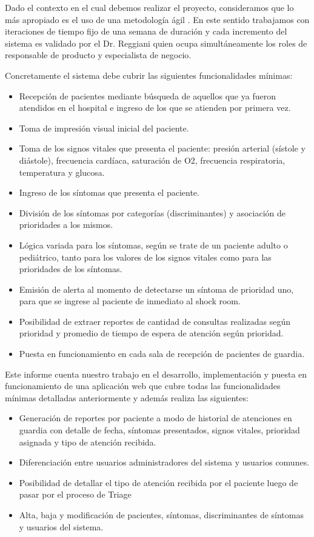 Dado el contexto en el cual debemos realizar el proyecto, consideramos que lo más apropiado es el uso de una metodología ágil \cite{Shore}. En este sentido trabajamos con iteraciones de tiempo fijo de una semana de duración y cada incremento del sistema es validado por el Dr. Reggiani quien ocupa simultáneamente los roles de responsable de producto y especialista de negocio.

Concretamente el sistema debe cubrir las siguientes funcionalidades mínimas:
\begin{itemize}
\item Recepción de pacientes mediante búsqueda de aquellos que ya fueron atendidos en el hospital e ingreso de los que se atienden por primera vez.
\item Toma de impresión visual inicial del paciente.
\item Toma de los signos vitales que presenta el paciente: presión arterial (sístole y diástole), frecuencia cardíaca, saturación de O2, frecuencia respiratoria, temperatura y glucosa.
\item Ingreso de los síntomas que presenta el paciente.
\item División de los síntomas por categorías (discriminantes) y asociación de prioridades a los mismos.
\item Lógica variada para los síntomas, según se trate de un paciente adulto o pediátrico, tanto para los valores de los signos vitales como para las prioridades de los síntomas.
\item Emisión de alerta al momento de detectarse un síntoma de prioridad uno, para que se ingrese al paciente de inmediato al shock room.
\item Posibilidad de extraer reportes de cantidad de consultas realizadas según prioridad y promedio de tiempo de espera de atención según prioridad.
\item Puesta en funcionamiento en cada sala de recepción de pacientes de guardia.
\end{itemize}

Este informe cuenta nuestro trabajo en el desarrollo, implementación y puesta en funcionamiento de una aplicación web que cubre todas las funcionalidades mínimas detalladas anteriormente y además realiza las siguientes:
\begin{itemize}
\item Generación de reportes por paciente a modo de historial de atenciones en guardia con detalle de fecha, síntomas presentados, signos vitales, prioridad asignada y tipo de atención recibida.
\item Diferenciación entre usuarios administradores del sistema y usuarios comunes.
\item Posibilidad de detallar el tipo de atención recibida por el paciente luego de pasar por el proceso de Triage
\item Alta, baja y modificación de pacientes, síntomas, discriminantes de síntomas y usuarios del sistema.
\end{itemize}


